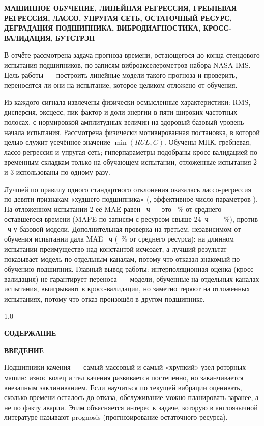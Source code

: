 \documentclass[14pt,a4paper]{extarticle}
\makeatletter
\renewcommand\tableofcontents{%
  \clearpage
  \begin{spacing}{1.0}%
  \begin{center}\bfseries СОДЕРЖАНИЕ\end{center}%
  \@starttoc{toc}%
  \end{spacing}%
}
\newcommand{\struct}[1]{%
  \clearpage
  \begin{center}\bfseries #1\end{center}%
  \addcontentsline{toc}{section}{#1}%
}
\makeatother
\begin{document}
\vspace{4mm}
\noindent\textbf{МАШИННОЕ ОБУЧЕНИЕ, ЛИНЕЙНАЯ РЕГРЕССИЯ, ГРЕБНЕВАЯ РЕГРЕССИЯ,
ЛАССО, УПРУГАЯ СЕТЬ, ОСТАТОЧНЫЙ РЕСУРС, ДЕГРАДАЦИЯ ПОДШИПНИКА,
ВИБРОДИАГНОСТИКА, КРОСС-ВАЛИДАЦИЯ, БУТСТРЭП}

\vspace{4mm}
\noindent
В отчёте рассмотрена задача прогноза времени, остающегося до конца стендового
испытания подшипников, по записям виброакселерометров набора NASA IMS.
Цель работы~--- построить линейные модели такого прогноза и проверить,
переносятся ли они на испытание, которое целиком отложено от обучения.

Из каждого сигнала извлечены физически осмысленные характеристики: RMS,
дисперсия, эксцесс, пик-фактор и доли энергии в пяти широких частотных
полосах, с нормировкой амплитудных величин на здоровый базовый уровень
начала испытания. Рассмотрена физически мотивированная постановка, в которой
целью служит усечённое значение $\min(RUL, C)$. Обучены МНК, гребневая,
лассо-регрессия и упругая сеть; гиперпараметры подобраны кросс-валидацией
по временным складкам только на обучающем испытании, отложенные испытания 2
и 3 использованы по одному разу.

Лучшей по правилу одного стандартного отклонения оказалась лассо-регрессия
по девяти признакам «худшего подшипника» (\BestHyper, эффективное число
параметров \BestDof). На отложенном испытании 2 её MAE равен \BestMAETest~ч
--- это \BestNMAETest~\% от среднего оставшегося времени (MAPE по записям
с ресурсом свыше 24~ч --- \BestMAPETest~\%), против \BaseMAETest~ч у базовой
модели. Дополнительная проверка на третьем, независимом от обучения
испытании дала MAE \BestMAETestThree~ч (\BestNMAETestThree~\% от среднего
ресурса): на длинном испытании преимущество над константой исчезает,
а лучший результат показывает модель по отдельным каналам, потому что
отказал знакомый по обучению подшипник. Главный вывод работы:
интерполяционная
оценка (кросс-валидация) не гарантирует переноса~--- модели, обученные
на отдельных каналах испытания, выигрывают в кросс-валидации, но заметно
теряют на отложенных испытаниях, потому что отказ произошёл в другом
подшипнике.

\tableofcontents

\struct{ВВЕДЕНИЕ}

Подшипники качения~--- самый массовый и самый «хрупкий» узел роторных машин:
износ колец и тел качения развивается постепенно, но заканчивается внезапным
заклиниванием. Если научиться по текущей вибрации оценивать, сколько времени
осталось до отказа, обслуживание можно планировать заранее, а не по факту
аварии. Этим объясняется интерес к задаче, которую в англоязычной литературе
называют prognosis (прогнозирование остаточного ресурса).
\end{document}
